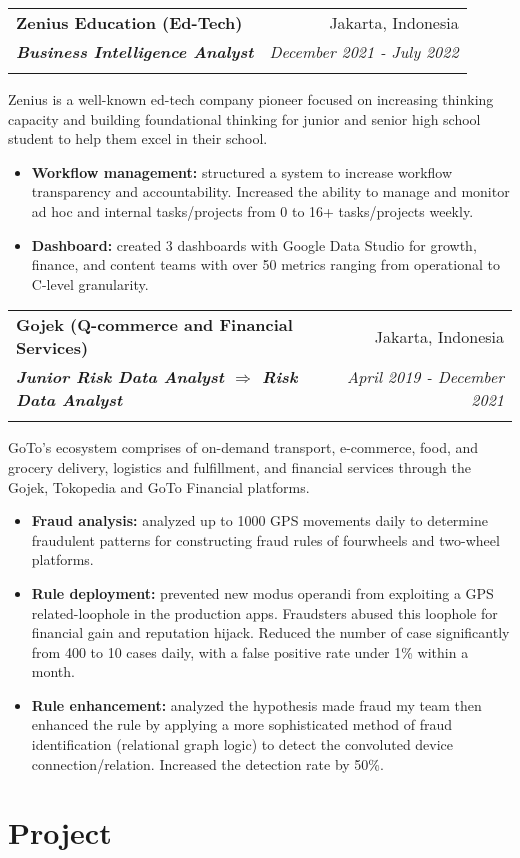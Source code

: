\documentclass[a4paper, 11pt]{article}
\makeatletter
\newcommand{\resumeItem}[2]{
    \item\small{
        \textbf{#1}{#2 \vspace{-2pt}}
    }
}
\newcommand{\resumeSubheading}[4]{
    \vspace{-1pt}
    \begin{tabular*}{\textwidth}{l@{\extracolsep{\fill}}r}
        \color{lightblue}\textbf{#1} & #2 \\
        \textbf{\textit{\small#3}} & \textit{\small #4} \\
        \textnormal{}\vspace{-5pt}
    \end{tabular*}\vspace{-5pt}
}
\newcommand{\resumeItemListStart}{\begin{itemize}[leftmargin=*]\setlength\itemsep{0em}\vspace{-1pt}}
\newcommand{\resumeItemListEnd}{\end{itemize}\vspace{-5pt}}
\makeatother
\begin{document}
    \vspace{5pt}
    \resumeSubheading
    {Zenius Education (Ed-Tech)}
    {Jakarta, Indonesia}
    {Business Intelligence Analyst}
    {December 2021 - July 2022}
    \small{Zenius is a well-known ed-tech company pioneer focused on increasing thinking 
    capacity and building foundational thinking for junior and senior high school 
    student to help them excel in their school.}
    \vspace{-1pt}
    \resumeItemListStart
    \resumeItem{Workflow management:}{ structured a system to increase 
    workflow transparency and accountability. Increased the ability to manage 
    and monitor ad hoc and internal tasks/projects from 0 to 
    16+ tasks/projects weekly.}
    \resumeItem{Dashboard:}{ created 3 dashboards with Google Data Studio for growth, finance, and content teams with over 50 metrics ranging from operational to C-level granularity.}
    \resumeItemListEnd

    \vspace{5pt}
    \resumeSubheading
    {Gojek (Q-commerce and Financial Services)}
    {Jakarta, Indonesia}
    {Junior Risk Data Analyst $\Rightarrow$ Risk Data Analyst}
    {April 2019 - December 2021}
    \small{GoTo’s ecosystem comprises of on-demand transport, e-commerce, food, and grocery delivery, logistics and fulfillment, and financial services through the Gojek, Tokopedia and GoTo Financial platforms.}
    \vspace{-1pt}
    \resumeItemListStart
    \resumeItem{Fraud analysis:}{ analyzed up to 1000 GPS movements
    daily to determine fraudulent patterns for constructing fraud 
    rules of fourwheels and two-wheel platforms.}
    \resumeItem{Rule deployment:}{ prevented new modus operandi from exploiting a GPS 
    related-loophole in the production apps. Fraudsters abused this loophole for 
    financial gain and reputation hijack. Reduced the number of
    case significantly from 400 to 10 cases daily, with a false positive rate under 1\%
    within a month.}
    \resumeItem{Rule enhancement:}{ analyzed the hypothesis made fraud my 
    team then enhanced the rule by applying a more sophisticated method of fraud 
    identification (relational graph logic) to detect the convoluted device 
    connection/relation. Increased the detection rate by 50\%.}
    \resumeItemListEnd

    \vspace{-5pt}
    \section{Project}
\end{document}
